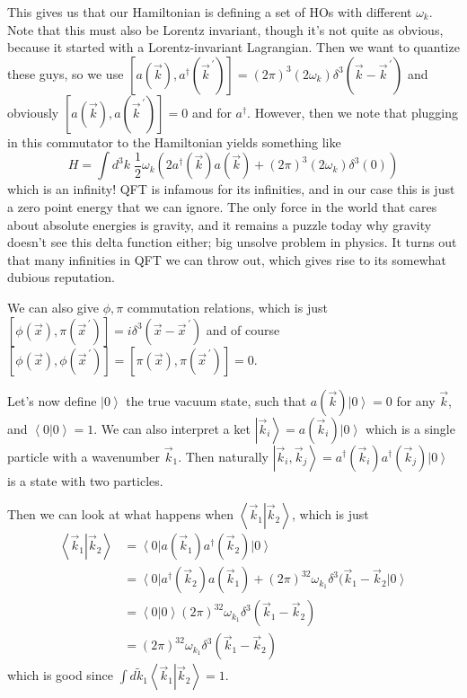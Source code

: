 \documentclass[10pt]{report}
\newcommand{\bra}[1]{\left<#1\right|}
\newcommand{\ket}[1]{\left|#1\right>}
\newcommand{\dotp}[2]{\left<#1\left.\right|#2\right>}
\newcommand{\pvec}[1]{\vec{#1}^{\,\prime}}
\begin{document}
This gives us that our Hamiltonian is defining a set of HOs with different $\omega_k$. Note that this must also be Lorentz invariant, though it's not quite as obvious, because it started with a Lorentz-invariant Lagrangian. Then we want to quantize these guys, so we use $[a(\vec{k}), a^\dagger(\pvec{k})] = (2\pi)^3(2\omega_k)\delta^3(\vec{k} - \pvec{k})$ and obviously $[a(\vec{k}), a(\pvec{k})] = 0$ and for $a^\dagger$. However, then we note that plugging in this commutator to the Hamiltonian yields something like
\begin{equation}
    H = \int d^3k\; \frac{1}{2}\omega_k \left( 2a^\dagger(\vec{k})a(\vec{k}) + (2\pi)^3(2\omega_k)\delta^3(0)\right)
\end{equation}
which is an infinity! QFT is infamous for its infinities, and in our case this is just a zero point energy that we can ignore. The only force in the world that cares about absolute energies is gravity, and it remains a puzzle today why gravity doesn't see this delta function either; big unsolve problem in physics. It turns out that many infinities in QFT we can throw out, which gives rise to its somewhat dubious reputation.

We can also give $\phi,\pi$ commutation relations, which is just $\left[ \phi(\vec{x}), \pi(\pvec{x}) \right] = i\delta^3(\vec{x} - \pvec{x})$ and of course $\left[ \phi(\vec{x}), \phi(\pvec{x}) \right] = \left[ \pi(\vec{x}), \pi(\pvec{x}) \right] = 0$.

Let's now define $\ket{0}$ the true vacuum state, such that $a(\vec{k})\ket{0} = 0$ for any $\vec{k}$, and $\dotp{0}{0} = 1$. We can also interpret a ket $\ket{\vec{k}_i} = a(\vec{k}_i)\ket{0}$ which is a single particle with a wavenumber $\vec{k}_1$. Then naturally $\ket{\vec{k}_i, \vec{k}_j} = a^\dagger(\vec{k}_i)a^\dagger(\vec{k}_j)\ket{0}$ is a state with two particles.

Then we can look at what happens when $\dotp{\vec{k}_1}{\vec{k}_2}$, which is just
\begin{align}
    \dotp{\vec{k}_1}{\vec{k}_2} &= \bra{0}a(\vec{k}_1)a^\dagger(\vec{k}_2)\ket{0}\\
    &= \bra{0}a^\dagger(\vec{k}_2)a(\vec{k}_1) + (2\pi)^32\omega_{k_1} \delta^3(\vec{k}_1 - \vec{k}_2\ket{0}\\
    &= \dotp{0}{0}(2\pi)^32\omega_{k_1} \delta^3(\vec{k}_1 - \vec{k}_2)\\
    &= (2\pi)^32\omega_{k_1} \delta^3(\vec{k}_1 - \vec{k}_2)
\end{align}
which is good since $\int d\tilde{k}_1 \dotp{\vec{k}_1}{\vec{k}_2} = 1$. 
\end{document}
